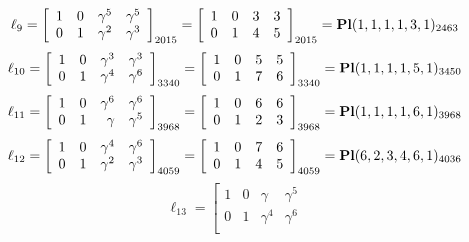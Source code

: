 \documentclass{article}
\begin{document}
{$$
\ell_{9} = 
\left[
\begin{array}{*{4}{r}}
1 & 0 & \gamma^{5} & \gamma^{5}\\
0 & 1 & \gamma^{2} & \gamma^{3}\\
\end{array}
\right]
_{2015}
=
\left[
\begin{array}{*{4}c}
1  & 0  & 3  & 3\\
0  & 1  & 4  & 5\\
\end{array}
\right]_{2015}
={\rm\bf Pl}(1,1,1,1,3,1 )_{2463}$$
$$
\ell_{10} = 
\left[
\begin{array}{*{4}{r}}
1 & 0 & \gamma^{3} & \gamma^{3}\\
0 & 1 & \gamma^{4} & \gamma^{6}\\
\end{array}
\right]
_{3340}
=
\left[
\begin{array}{*{4}c}
1  & 0  & 5  & 5\\
0  & 1  & 7  & 6\\
\end{array}
\right]_{3340}
={\rm\bf Pl}(1,1,1,1,5,1 )_{3450}$$
$$
\ell_{11} = 
\left[
\begin{array}{*{4}{r}}
1 & 0 & \gamma^{6} & \gamma^{6}\\
0 & 1 & \gamma  & \gamma^{5}\\
\end{array}
\right]
_{3968}
=
\left[
\begin{array}{*{4}c}
1  & 0  & 6  & 6\\
0  & 1  & 2  & 3\\
\end{array}
\right]_{3968}
={\rm\bf Pl}(1,1,1,1,6,1 )_{3968}$$
$$
\ell_{12} = 
\left[
\begin{array}{*{4}{r}}
1 & 0 & \gamma^{4} & \gamma^{6}\\
0 & 1 & \gamma^{2} & \gamma^{3}\\
\end{array}
\right]
_{4059}
=
\left[
\begin{array}{*{4}c}
1  & 0  & 7  & 6\\
0  & 1  & 4  & 5\\
\end{array}
\right]_{4059}
={\rm\bf Pl}(6,2,3,4,6,1 )_{4036}$$
$$
\ell_{13} = 
\left[
\begin{array}{*{4}{r}}
1 & 0 & \gamma  & \gamma^{5}\\
0 & 1 & \gamma^{4} & \gamma^{6}\\
\end{array}
$$}
\end{document}

